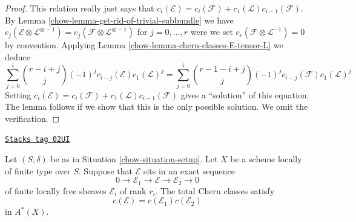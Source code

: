 \begin{proof}

This relation really just says that
$c_i(\mathcal{E}) = c_i(\mathcal{F}) + c_1(\mathcal{L})c_{i - 1}(\mathcal{F})$.
By Lemma \ref{chow-lemma-get-rid-of-trivial-subbundle}
we have $c_j(\mathcal{E} \otimes \mathcal{L}^{\otimes -1})
= c_j(\mathcal{F} \otimes \mathcal{L}^{\otimes -1})$ for
$j = 0, \ldots, r$ were we set
$c_r(\mathcal{F} \otimes \mathcal{L}^{-1}) = 0$ by convention.
Applying Lemma \ref{chow-lemma-chern-classes-E-tensor-L} we deduce
$$
\sum_{j = 0}^i
\binom{r - i + j}{j} (-1)^j c_{i - j}({\mathcal E}) c_1({\mathcal L})^j
=
\sum_{j = 0}^i
\binom{r - 1 - i + j}{j} (-1)^j c_{i - j}({\mathcal F}) c_1({\mathcal L})^j
$$
Setting
$c_i(\mathcal{E}) = c_i(\mathcal{F}) + c_1(\mathcal{L})c_{i - 1}(\mathcal{F})$
gives a ``solution'' of this equation. The lemma follows if we show
that this is the only possible solution. We omit the verification.
\end{proof}

\begin{lemma}
\label{chow-lemma-additivity-chern-classes}
\href{https://stacks.math.columbia.edu/tag/02UI}{\texttt{Stacks tag 02UI}}

Let $(S, \delta)$ be as in Situation \ref{chow-situation-setup}.
Let $X$ be a scheme locally of finite type over $S$.
Suppose that ${\mathcal E}$ sits in an
exact sequence
$$
0
\to
{\mathcal E}_1
\to
{\mathcal E}
\to
{\mathcal E}_2
\to
0
$$
of finite locally free sheaves $\mathcal{E}_i$ of rank $r_i$.
The total Chern classes satisfy
$$
c({\mathcal E}) = c({\mathcal E}_1) c({\mathcal E}_2)
$$
in $A^*(X)$.
\end{lemma}


